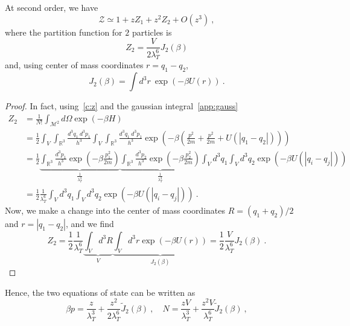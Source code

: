     At second order, we have 
    \begin{equation*}
        \mathcal Z \simeq 1 + z Z_1 + z^2 Z_2 + O(z^3) ~,
    \end{equation*}
    where the partition function for $2$ particles is 
    \begin{equation*}
        Z_2 = \frac{V}{2 \lambda_T^6} J_2 (\beta) 
    \end{equation*}
    and, using center of mass coordinates $r = q_1 - q_2$,
    \begin{equation*}
        J_2 (\beta) = \int d^3 r ~ \exp(- \beta U(r)) ~.
    \end{equation*}
    \begin{proof}
        In fact, using~\eqref{c:z} and the gaussian integral~\eqref{app:gauss}
        \begin{equation*}
        \begin{aligned}
            Z_2 & = \frac{1}{N!} \int_{\mathcal M^2} d \Omega \exp(- \beta H) \\ & = \frac{1}{2} \int_V \int_{\mathbb R^3}\frac{d^3 q_1 ~ d^3 p_1}{h^3} \int_V \int_{\mathbb R^3}\frac{d^3 q_1 ~ d^3 p_1}{h^3} \exp(- \beta (\frac{p^2}{2m} + \frac{p^2}{2m} + U(|q_1 - q_2|))) \\ & = \frac{1}{2} \underbrace{\int_{\mathbb R^3} \frac{d^3 p_1}{h^3} \exp(- \beta \frac{p_1^2}{2m})}_{\frac{1}{\lambda_T^3}} \underbrace{\int_{\mathbb R^3} \frac{d^3 p_2}{h^3} \exp(- \beta \frac{p_2^2}{2m})}_{\frac{1}{\lambda_T^3}} \int_V d^3 q_1 \int_V d^3 q_2 \exp(- \beta U(|q_i - q_j|)) \\ & = \frac{1}{2} \frac{1}{\lambda_T^6} \int_V d^3 q_1 \int_V d^3 q_2 \exp(- \beta U(|q_i - q_j|)) ~.
        \end{aligned}
        \end{equation*}
        Now, we make a change into the center of mass coordinates $R = (q_1 + q_2)/2$ and $r = |q_1 - q_2|$, and we find
        \begin{equation*}
            Z_2 = \frac{1}{2} \frac{1}{\lambda_T^6} \underbrace{\int_V d^3 R}_V \underbrace{\int_V d^3 r \exp(- \beta U(r)) }_{J_2 (\beta)} = \frac{1}{2} \frac{V}{\lambda_T^6} J_2 (\beta) ~.
        \end{equation*}
    \end{proof}
    Hence, the two equations of state can be written as 
    \begin{equation*}
        \beta p = \frac{z}{\lambda_T^3} + \frac{z^2}{2 \lambda_T^6} \tilde J_2 (\beta) ~, \quad N = \frac{z V}{\lambda_T^3} + \frac{z^2 V }{\lambda_T^6} \tilde J_2 (\beta) ~,
    \end{equation*}
